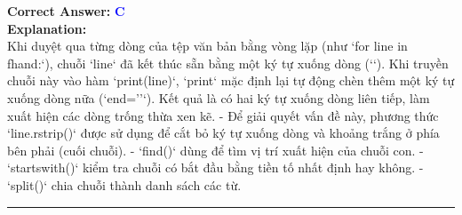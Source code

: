 \documentclass[11pt,a4paper]{article}
\begin{document}
\begin{minipage}{\textwidth}
\noindent \textbf{Correct Answer:} \textcolor{blue}{\textbf{C}} \\[4pt]
\noindent \textbf{Explanation:}\\
Khi duyệt qua từng dòng của tệp văn bản bằng vòng lặp (như `for line in fhand:`), chuỗi `line` đã kết thúc sẵn bằng một ký tự xuống dòng (`\n`). Khi truyền chuỗi này vào hàm `print(line)`, `print` mặc định lại tự động chèn thêm một ký tự xuống dòng nữa (`end='\n'`). Kết quả là có hai ký tự xuống dòng liên tiếp, làm xuất hiện các dòng trống thừa xen kẽ.\newline
- Để giải quyết vấn đề này, phương thức `line.rstrip()` được sử dụng để cắt bỏ ký tự xuống dòng và khoảng trắng ở phía bên phải (cuối chuỗi).\newline
- `find()` dùng để tìm vị trí xuất hiện của chuỗi con.\newline
- `startswith()` kiểm tra chuỗi có bắt đầu bằng tiền tố nhất định hay không.\newline
- `split()` chia chuỗi thành danh sách các từ.
\end{minipage}
\vspace{0.8cm}
\hrule
\vspace{0.5cm}
\end{document}
